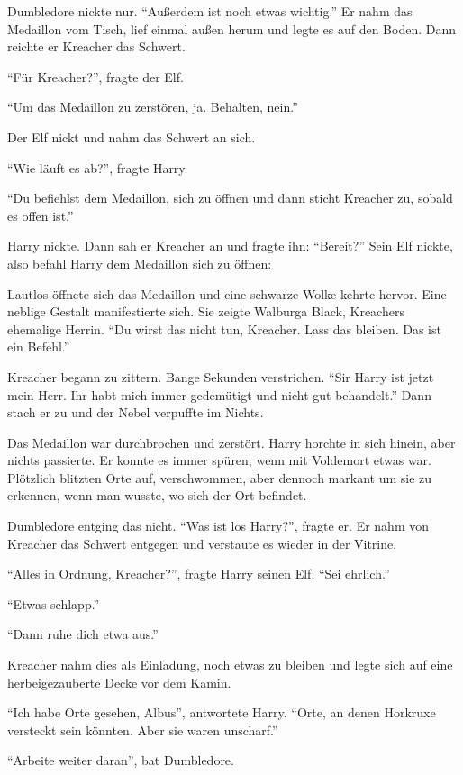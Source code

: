 Dumbledore nickte nur. \enquote{Außerdem ist noch etwas wichtig.} Er nahm das Medaillon vom Tisch, lief einmal außen herum und legte es auf den Boden. Dann reichte er Kreacher das Schwert.

\enquote{Für Kreacher?}, fragte der Elf.

\enquote{Um das Medaillon zu zerstören, ja. Behalten, nein.}

Der Elf nickt und nahm das Schwert an sich.

\enquote{Wie läuft es ab?}, fragte Harry.

\enquote{Du befiehlst dem Medaillon, sich zu öffnen und dann sticht Kreacher zu, sobald es offen ist.}

Harry nickte. Dann sah er Kreacher an und fragte ihn: \enquote{Bereit?} Sein Elf nickte, also befahl Harry dem Medaillon sich zu öffnen: 

Lautlos öffnete sich das Medaillon und eine schwarze Wolke kehrte hervor. Eine neblige Gestalt manifestierte sich. Sie zeigte Walburga Black, Kreachers ehemalige Herrin. \enquote{Du wirst das nicht tun, Kreacher. Lass das bleiben. Das ist ein Befehl.}

Kreacher begann zu zittern. Bange Sekunden verstrichen. \enquote{Sir Harry ist jetzt mein Herr. Ihr habt mich immer gedemütigt und nicht gut behandelt.} Dann stach er zu und der Nebel verpuffte im Nichts.

Das Medaillon war durchbrochen und zerstört. Harry horchte in sich hinein, aber nichts passierte. Er konnte es immer spüren, wenn mit Voldemort etwas war. Plötzlich blitzten Orte auf, verschwommen, aber dennoch markant um sie zu erkennen, wenn man wusste, wo sich der Ort befindet.

Dumbledore entging das nicht. \enquote{Was ist los Harry?}, fragte er. Er nahm von Kreacher das Schwert entgegen und verstaute es wieder in der Vitrine.

\enquote{Alles in Ordnung, Kreacher?}, fragte Harry seinen Elf. \enquote{Sei ehrlich.}

\enquote{Etwas schlapp.}

\enquote{Dann ruhe dich etwa aus.}

Kreacher nahm dies als Einladung, noch etwas zu bleiben und legte sich auf eine herbeigezauberte Decke vor dem Kamin.

\enquote{Ich habe Orte gesehen, Albus}, antwortete Harry. \enquote{Orte, an denen Horkruxe versteckt sein könnten. Aber sie waren unscharf.}

\enquote{Arbeite weiter daran}, bat Dumbledore.


